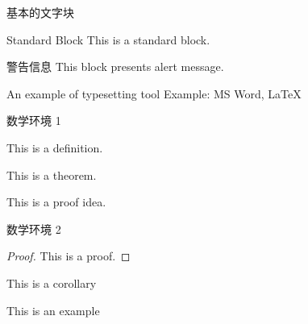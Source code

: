 \documentclass{ctexbeamer}
\begin{document}
\begin{frame}{基本的文字块}
  \begin{block}{Standard Block}
    This is a standard block.
  \end{block}

  \begin{alertblock}{警告信息}
    This block presents alert message.
  \end{alertblock}

  \begin{exampleblock}{An example of typesetting tool}
    Example: MS Word, \LaTeX{}
  \end{exampleblock}
\end{frame}

\begin{frame}{数学环境 1}
  \begin{definition} 
    This is a definition.
  \end{definition}
  
  \begin{theorem} 
    This is a theorem. 
  \end{theorem}
  
  \begin{lemma} 
    This is a proof idea.
  \end{lemma}
\end{frame}

\begin{frame}{数学环境 2}
  \begin{proof} 
    This is a proof. 
  \end{proof}
  
  \begin{corollary}
    This is a corollary
  \end{corollary}
  
  \begin{example}
    This is an example 
  \end{example}
\end{frame}
\end{document}
